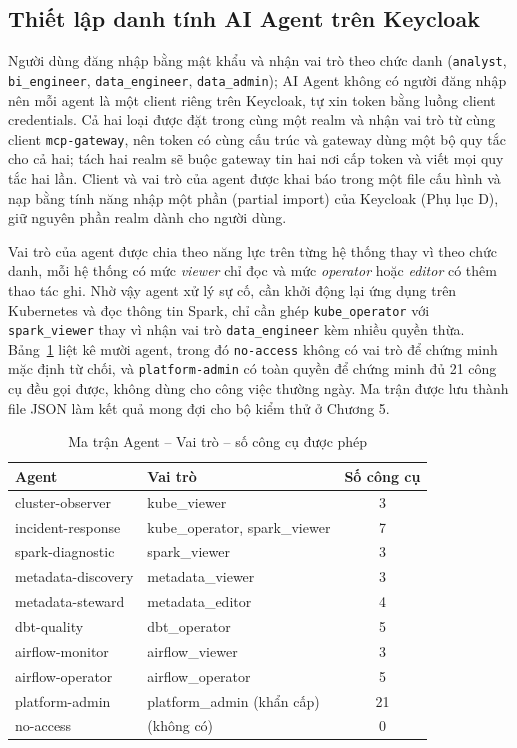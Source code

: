 \documentclass[a4paper]{article}
\begin{document}
\subsection{Thiết lập danh tính AI Agent trên Keycloak}\label{sec:agent}

Người dùng đăng nhập bằng mật khẩu và nhận vai trò theo chức danh (\texttt{analyst}, \texttt{bi\_engineer}, \texttt{data\_engineer}, \texttt{data\_admin}); AI Agent không có người đăng nhập nên mỗi agent là một client riêng trên Keycloak, tự xin token bằng luồng client credentials. Cả hai loại được đặt trong cùng một realm và nhận vai trò từ cùng client \texttt{mcp-gateway}, nên token có cùng cấu trúc và gateway dùng một bộ quy tắc cho cả hai; tách hai realm sẽ buộc gateway tin hai nơi cấp token và viết mọi quy tắc hai lần. Client và vai trò của agent được khai báo trong một file cấu hình và nạp bằng tính năng nhập một phần (partial import) của Keycloak (Phụ lục D), giữ nguyên phần realm dành cho người dùng.

Vai trò của agent được chia theo năng lực trên từng hệ thống thay vì theo chức danh, mỗi hệ thống có mức \textit{viewer} chỉ đọc và mức \textit{operator} hoặc \textit{editor} có thêm thao tác ghi. Nhờ vậy agent xử lý sự cố, cần khởi động lại ứng dụng trên Kubernetes và đọc thông tin Spark, chỉ cần ghép \texttt{kube\_operator} với \texttt{spark\_viewer} thay vì nhận vai trò \texttt{data\_engineer} kèm nhiều quyền thừa. Bảng~\ref{tab:agents} liệt kê mười agent, trong đó \texttt{no-access} không có vai trò để chứng minh mặc định từ chối, và \texttt{platform-admin} có toàn quyền để chứng minh đủ 21 công cụ đều gọi được, không dùng cho công việc thường ngày. Ma trận được lưu thành file JSON làm kết quả mong đợi cho bộ kiểm thử ở Chương 5.

\begin{table}[H]\centering\caption{Ma trận Agent -- Vai trò -- số công cụ được phép}\label{tab:agents}
{\singlespacing\renewcommand{\arraystretch}{1.15}\small
\begin{tabularx}{\textwidth}{|p{4.6cm}|X|c|}\hline
\textbf{Agent} & \textbf{Vai trò} & \textbf{Số công cụ} \\ \hline
cluster-observer & kube\_viewer & 3 \\ \hline
incident-response & kube\_operator, spark\_viewer & 7 \\ \hline
spark-diagnostic & spark\_viewer & 3 \\ \hline
metadata-discovery & metadata\_viewer & 3 \\ \hline
metadata-steward & metadata\_editor & 4 \\ \hline
dbt-quality & dbt\_operator & 5 \\ \hline
airflow-monitor & airflow\_viewer & 3 \\ \hline
airflow-operator & airflow\_operator & 5 \\ \hline
platform-admin & platform\_admin (khẩn cấp) & 21 \\ \hline
no-access & (không có) & 0 \\ \hline
\end{tabularx}}\end{table}
\end{document}
